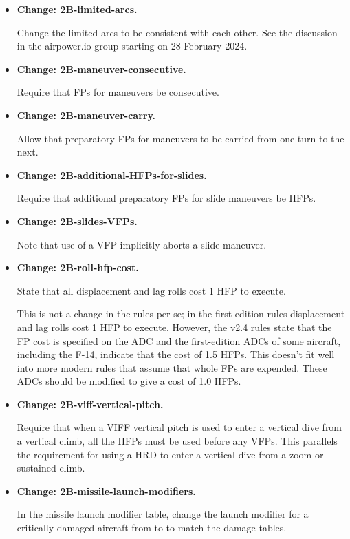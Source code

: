 \documentclass{report}
\newcommand{\changetag}[1]{\textbf{Change: #1.}\par}
\begin{document}
\begin{itemize}
    \item\changetag{2B-limited-arcs}

        Change the limited arcs to be consistent with each other. See the discussion in the airpower.io group starting on 28 February 2024.

    \item\changetag{2B-maneuver-consecutive}

        Require that FPs for maneuvers be consecutive.

    \item\changetag{2B-maneuver-carry}

        Allow that preparatory FPs for maneuvers to be carried from one turn to the next.

    \item\changetag{2B-additional-HFPs-for-slides}

        Require that additional preparatory FPs for slide maneuvers be HFPs.

    \item\changetag{2B-slides-VFPs}

        Note that use of a VFP implicitly aborts a slide maneuver.

    \item\changetag{2B-roll-hfp-cost}

        State that all displacement and lag rolls cost 1 HFP to execute.

        This is not a change in the rules per se; in the first-edition rules displacement and lag rolls cost 1 HFP to execute. However, the v2.4 rules state that the FP cost is specified on the ADC and the first-edition ADCs of some aircraft, including the F-14, indicate that the cost of 1.5 HFPs. This doesn't fit well into more modern rules that assume that whole FPs are expended. These ADCs should be modified to give a cost of 1.0 HFPs.

    \item\changetag{2B-viff-vertical-pitch}

        Require that when a VIFF vertical pitch is used to enter a vertical dive from a vertical climb, all the HFPs must be used before any VFPs. This parallels the requirement for using a HRD to enter a vertical dive from a zoom or sustained climb.

    \item\changetag{2B-missile-launch-modifiers}

        In the missile launch modifier table, change the launch modifier for a critically damaged aircraft from  to  to match the damage tables.


\end{itemize}
\end{document}
